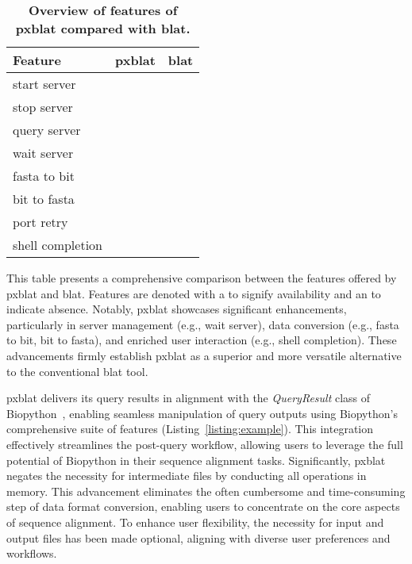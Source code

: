 \documentclass[10pt,letterpaper]{article}
\newcommand{\cmark}{\ding{51}}%
\newcommand{\xmark}{\ding{55}}%
\begin{document}
\begin{table}[!ht]
	\centering
	\caption{{\bf Overview of features of \gls{pxblat} compared with \gls{blat}.}}\label{tab:apicmp}
	\begin{tabular}{@{}lll@{}}
		\toprule
		Feature          & \gls{pxblat} & \gls{blat} \\ \midrule
		start server     & \cmark{}     & \cmark{}   \\
		stop  server     & \cmark{}     & \cmark{}   \\
		query server     & \cmark{}     & \cmark{}   \\
		wait server      & \cmark{}     & \xmark{}   \\
		fasta to bit     & \cmark{}     & \xmark{}   \\
		bit to fasta     & \cmark{}     & \xmark{}   \\
		port retry       & \cmark{}     & \xmark{}   \\
		shell completion & \cmark{}     & \xmark{}   \\
		\bottomrule
	\end{tabular}
	\begin{flushleft}
        This table presents a comprehensive comparison between the features offered by \gls{pxblat} and \gls{blat}.
        Features are denoted with a \cmark{} to signify availability and an \xmark{} to indicate absence.
        Notably, \gls{pxblat} showcases significant enhancements, particularly in server management (e.g., wait server), data conversion (e.g., fasta to bit, bit to fasta), and enriched user interaction (e.g., shell completion).
        These advancements firmly establish \gls{pxblat} as a superior and more versatile alternative to the conventional \gls{blat} tool.
	\end{flushleft}
\end{table}

\gls{pxblat} delivers its query results in alignment with the \emph{QueryResult} class of Biopython~\cite{cock2009biopython}, enabling seamless manipulation of query outputs using Biopython's comprehensive suite of features (Listing~\ref{listing:example}).
This integration effectively streamlines the post-query workflow, allowing users to leverage the full potential of Biopython in their sequence alignment tasks.
Significantly, \gls{pxblat} negates the necessity for intermediate files by conducting all operations in memory.
This advancement eliminates the often cumbersome and time-consuming step of data format conversion, enabling users to concentrate on the core aspects of sequence alignment.
To enhance user flexibility, the necessity for input and output files has been made optional, aligning with diverse user preferences and workflows.
\end{document}

